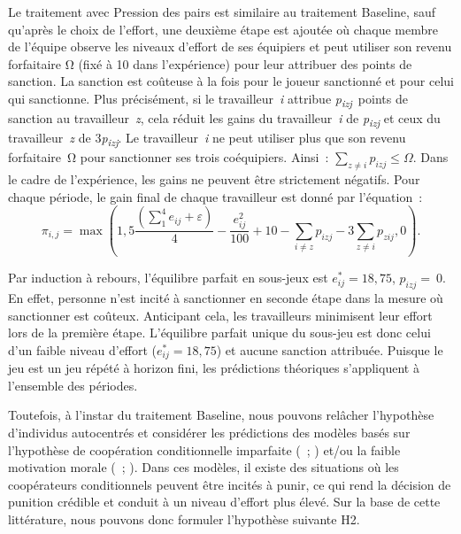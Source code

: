 \begin{Article}
\begin{refsection}[Lebourges]
\begin{appendices}
Le traitement avec Pression des pairs est similaire au traitement
Baseline, sauf qu'après le choix de l'effort, une deuxième étape est
ajoutée où chaque membre de l'équipe observe les niveaux d'effort de ses
équipiers et peut utiliser son revenu forfaitaire Ω (fixé à 10 dans
l'expérience) pour leur attribuer des points de sanction. La sanction
est coûteuse à la fois pour le joueur sanctionné et pour celui qui
sanctionne. Plus précisément, si le travailleur~\emph{i} attribue
\emph{p\textsubscript{izj}}~points de sanction au travailleur~\emph{z},
cela réduit les gains du travailleur~\emph{i} de
\emph{p\textsubscript{izj}} et ceux du travailleur~\emph{z} de
3\emph{p\textsubscript{izj}}. Le travailleur~\emph{i} ne peut utiliser
plus que son revenu forfaitaire~Ω pour sanctionner ses trois
coéquipiers. Ainsi~: \(\sum_{z \neq i}^{}p_{izj} \leq \Omega\). Dans le
cadre de l'expérience, les gains ne peuvent être strictement négatifs.
Pour chaque période, le gain final de chaque travailleur est donné par
l'équation~:
\begin{equation}
    \pi_{i,j} = \max\left( 1,5\frac{\left( \sum_{1}^{4}{e_{ij} + \varepsilon} \right)}{4} - \frac{e_{ij}^{2}}{100} + 10 - \sum_{i \neq z}^{}p_{izj} - 3\sum_{z \neq i}^{}p_{zij},0 \right).
\end{equation}

Par induction à rebours, l'équilibre parfait en sous-jeux est
$e_{ij}^{*}=18,75$, $p_{izj}=~0$. En effet, personne n'est incité à
sanctionner en seconde étape dans la mesure où sanctionner est coûteux.
Anticipant cela, les travailleurs minimisent leur effort lors de la
première étape. L'équilibre parfait unique du sous-jeu est donc celui
d'un faible niveau d'effort (\(e_{ij}^{*} = 18,75\)) et aucune sanction
attribuée. Puisque le jeu est un jeu répété à horizon fini, les
prédictions théoriques s'appliquent à l'ensemble des périodes.

Toutefois, à l'instar du traitement Baseline, nous pouvons relâcher
l'hypothèse d'individus autocentrés et considérer les prédictions des
modèles basés sur l'hypothèse de coopération conditionnelle imparfaite
(\textcite{FischbacherGächterFehr2001}~; \textcite{FischbacherGächter2010}) et/ou la faible motivation morale (\textcite{FiguièresMascletWillinger2013}~; \textcite{MascletDickinson2019}). Dans ces
modèles, il existe des situations où les coopérateurs conditionnels
peuvent être incités à punir, ce qui rend la décision de punition
crédible et conduit à un niveau d'effort plus élevé. Sur la base de
cette littérature, nous pouvons donc formuler l'hypothèse suivante H2.


\end{appendices}
\end{refsection}
\end{Article}
